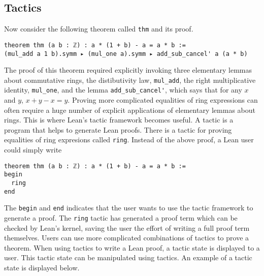 \documentclass[12pt]{article} %
\theoremstyle{definition}
\theoremstyle{definition}
\theoremstyle{definition}
\theoremstyle{definition}
\begin{document}

\subsection{Tactics}

Now consider the following theorem called \lstinline{thm} and its proof.

\begin{lstlisting}
theorem thm (a b : ℤ) : a * (1 + b) - a = a * b :=
(mul_add a 1 b).symm ▸ (mul_one a).symm ▸ add_sub_cancel' a (a * b)
\end{lstlisting}

The proof of this theorem required explicitly invoking three elementary lemmas about commutative
rings, the distibutivity law, \lstinline{mul_add}, the right multiplicative identity,
\lstinline{mul_one}, and the lemma \lstinline{add_sub_cancel'},
which says that for any $x$ and $y$, $x + y - x = y$.
Proving more complicated equalities of ring expressions can often require a huge
number of explicit applications of elementary lemmas about rings. This is where Lean's
tactic framework becomes useful. A tactic is a program that helps to generate Lean proofs. There is
a tactic for proving equalities of ring expresions called \lstinline{ring}. Instead
of the above proof, a Lean user could simply write

\begin{lstlisting}
theorem thm (a b : ℤ) : a * (1 + b) - a = a * b :=
begin
  ring
end
\end{lstlisting}

The \lstinline{begin} and \lstinline{end} indicates that the user wants to use the tactic
framework to generate a proof. The \lstinline{ring} tactic has generated a proof term
which can be checked by Lean's kernel, saving the user the effort of writing a full proof
term themselves.
 Users can use more complicated combinations of tactics
to prove a theorem. When using tactics to write a Lean proof, a tactic state is displayed to a user.
This tactic state can be manipulated using tactics. An example of a tactic state is displayed
below.
\end{document}
